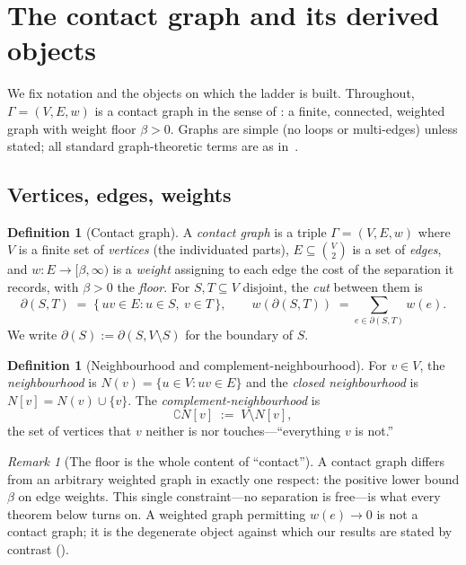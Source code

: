 \documentclass[11pt,a4paper]{article}
\theoremstyle{thmstyle}
\theoremstyle{definition}
\newtheorem{definition}[theorem]{Definition}
\theoremstyle{remark}
\newtheorem{remark}[theorem]{Remark}
\newcommand{\Gph}{\Gamma}                 %
\newcommand{\V}{V}                        %
\newcommand{\E}{E}                        %
\newcommand{\wt}{w}                       %
\newcommand{\floorc}{\beta}               %
\newcommand{\Nbr}{N}                      %
\newcommand{\co}{\complement}             %
\newcommand{\cut}{\partial}               %
\begin{document}
\section{The contact graph and its derived objects}
\label{sec:setting}

We fix notation and the objects on which the ladder is built. Throughout,
$\Gph=(\V,\E,\wt)$ is a contact graph in the sense of : a finite,
connected, weighted graph with weight floor $\floorc>0$. Graphs are simple
(no loops or multi-edges) unless stated; all standard graph-theoretic terms are
as in~\citet{bondymurty2008,diestel2017}.

\subsection{Vertices, edges, weights}

\begin{definition}[Contact graph]
\label{def:contactgraph}
A \emph{contact graph} is a triple $\Gph=(\V,\E,\wt)$ where $\V$ is a finite set
of \emph{vertices} (the individuated parts), $\E\subseteq\binom{\V}{2}$ is a set
of \emph{edges}, and $\wt\colon\E\to[\floorc,\infty)$ is a \emph{weight}
assigning to each edge the cost of the separation it records, with
$\floorc>0$ the \emph{floor}. For $S,T\subseteq\V$ disjoint, the
\emph{cut} between them is
\[
\cut(S,T)\;=\;\{\,uv\in\E : u\in S,\ v\in T\,\},
\qquad
\wt(\cut(S,T))\;=\!\!\sum_{e\in\cut(S,T)}\!\!\wt(e).
\]
We write $\cut(S):=\cut(S,\V\setminus S)$ for the boundary of $S$.
\end{definition}

\begin{definition}[Neighbourhood and complement-neighbourhood]
\label{def:nbr}
For $v\in\V$, the \emph{neighbourhood} is
$\Nbr(v)=\{u\in\V : uv\in\E\}$ and the \emph{closed neighbourhood} is
$\Nbr[v]=\Nbr(v)\cup\{v\}$. The \emph{complement-neighbourhood} is
\[
\co\Nbr[v]\;:=\;\V\setminus\Nbr[v],
\]
the set of vertices that $v$ neither is nor touches---``everything $v$ is not.''
\end{definition}

\begin{remark}[The floor is the whole content of ``contact'']
\label{rem:floor-content}
A contact graph differs from an arbitrary weighted graph in exactly one
respect: the positive lower bound $\floorc$ on edge weights. This single
constraint---no separation is free---is what every theorem below turns on. A
weighted graph permitting $\wt(e)\to0$ is not a contact graph; it is the
degenerate object against which our results are stated by contrast
().
\end{remark}
\end{document}
